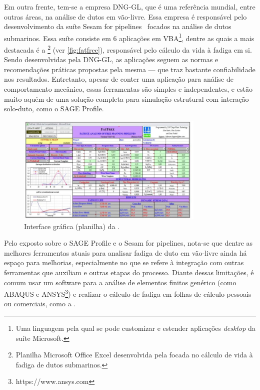 

Em outra frente, tem-se a empresa DNG-GL, que é uma referência mundial, entre outras áreas, na análise de dutos em vão-livre.
Essa empresa é responsável pelo desenvolvimento da suíte Sesam for pipelines~\cite{dnvsesam} focados na análise de dutos submarinos.
Essa suíte consiste em 6 aplicações em VBA\footnote{Uma linguagem pela qual se pode customizar e estender aplicações \textit{desktop} da suíte Microsoft.}, dentre as quais a mais destacada é a \fatfree\footnote{Planilha Microsoft Office Excel desenvolvida pela  focada no cálculo de vida à fadiga de dutos submarinos.} (ver \autoref{fig:fatfree}), responsável pelo cálculo da vida à fadiga em si. Sendo desenvolvidas pela DNG-GL, as aplicações seguem as normas e recomendações práticas propostas pela mesma --- que traz bastante confiabilidade nos resultados. Entretanto, apesar de conter uma aplicação para análise de comportamento mecânico, essas ferramentas são simples e independentes, e estão muito aquém de uma solução completa para simulação estrutural com interação solo-duto, como o SAGE Profile.

\begin{figure}[!ht]
    \centering
    \caption{Interface gráfica (planilha) da \fatfree.}\label{fig:fatfree}
    \includegraphics[width=0.8\textwidth]{imagens/fatfree}
\end{figure}

Pelo exposto sobre o SAGE Profile e o Sesam for pipelines, nota-se que dentre as melhores ferramentas atuais para analisar fadiga de duto em vão-livre ainda há espaço para melhorias, especialmente no que se refere à integração com outras ferramentas que auxiliam e outras etapas do processo. Diante dessas limitações, é comum usar um software para a análise de elementos finitos genérico (como ABAQUS e ANSYS\footnote{https://www.ansys.com}) e realizar o cálculo de fadiga em folhas de cálculo pessoais ou comerciais, como a \fatfree.


